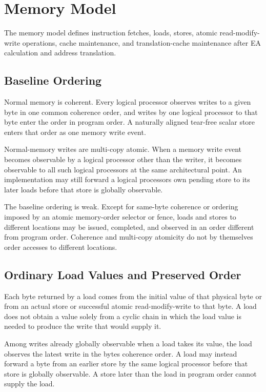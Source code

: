 \clearpage
\section{Memory Model}\label{page:memory-model}

The memory model defines instruction fetches, loads, stores, atomic read-modify-write operations, cache maintenance,
and translation-cache maintenance after EA calculation and address translation.

\subsection{Baseline Ordering}
Normal memory is coherent. Every logical processor observes writes to a given byte in one common coherence order, and
writes by one logical processor to that byte enter the order in program order. A naturally aligned tear-free scalar
store enters that order as one memory write event.

Normal-memory writes are multi-copy atomic. When a memory write event becomes observable by a logical processor other than
the writer, it becomes observable to all such logical processors at the same architectural point. An implementation may still
forward a logical processor\textquotesingle{}s own pending store to its later loads before that store is globally observable.

The baseline ordering is weak. Except for same-byte coherence or ordering imposed by an atomic memory-order selector
or fence, loads and stores to different locations may be issued, completed, and observed in an order different from
program order. Coherence and multi-copy atomicity do not by themselves order accesses to different locations.

\subsection{Ordinary Load Values and Preserved Order}
Each byte returned by a load comes from the initial value of that physical byte or from an actual store or successful
atomic read-modify-write to that byte. A load does not obtain a value solely from a cyclic chain in which the load
value is needed to produce the write that would supply it.

Among writes already globally observable when a load takes its value, the load observes the latest write in the
byte\textquotesingle{}s coherence order. A load may instead forward a byte from an earlier store by the same logical processor before
that store is globally observable. A store later than the load in program order cannot supply the load.

